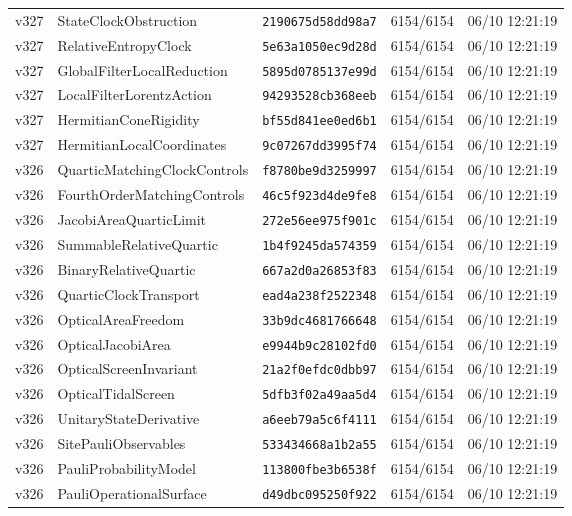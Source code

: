 \documentclass[11pt]{article}
\theoremstyle{definition}\newtheorem{deriv}{Derivation}
\begin{document}
{\begin{longtable}{@{}lllll@{}}
v327 & StateClockObstruction & \texttt{2190675d58dd98a7} & 6154/6154 & 06/10 12:21:19 \\
v327 & RelativeEntropyClock & \texttt{5e63a1050ec9d28d} & 6154/6154 & 06/10 12:21:19 \\
v327 & GlobalFilterLocalReduction & \texttt{5895d0785137e99d} & 6154/6154 & 06/10 12:21:19 \\
v327 & LocalFilterLorentzAction & \texttt{94293528cb368eeb} & 6154/6154 & 06/10 12:21:19 \\
v327 & HermitianConeRigidity & \texttt{bf55d841ee0ed6b1} & 6154/6154 & 06/10 12:21:19 \\
v327 & HermitianLocalCoordinates & \texttt{9c07267dd3995f74} & 6154/6154 & 06/10 12:21:19 \\
v326 & QuarticMatchingClockControls & \texttt{f8780be9d3259997} & 6154/6154 & 06/10 12:21:19 \\
v326 & FourthOrderMatchingControls & \texttt{46c5f923d4de9fe8} & 6154/6154 & 06/10 12:21:19 \\
v326 & JacobiAreaQuarticLimit & \texttt{272e56ee975f901c} & 6154/6154 & 06/10 12:21:19 \\
v326 & SummableRelativeQuartic & \texttt{1b4f9245da574359} & 6154/6154 & 06/10 12:21:19 \\
v326 & BinaryRelativeQuartic & \texttt{667a2d0a26853f83} & 6154/6154 & 06/10 12:21:19 \\
v326 & QuarticClockTransport & \texttt{ead4a238f2522348} & 6154/6154 & 06/10 12:21:19 \\
v326 & OpticalAreaFreedom & \texttt{33b9dc4681766648} & 6154/6154 & 06/10 12:21:19 \\
v326 & OpticalJacobiArea & \texttt{e9944b9c28102fd0} & 6154/6154 & 06/10 12:21:19 \\
v326 & OpticalScreenInvariant & \texttt{21a2f0efdc0dbb97} & 6154/6154 & 06/10 12:21:19 \\
v326 & OpticalTidalScreen & \texttt{5dfb3f02a49aa5d4} & 6154/6154 & 06/10 12:21:19 \\
v326 & UnitaryStateDerivative & \texttt{a6eeb79a5c6f4111} & 6154/6154 & 06/10 12:21:19 \\
v326 & SitePauliObservables & \texttt{533434668a1b2a55} & 6154/6154 & 06/10 12:21:19 \\
v326 & PauliProbabilityModel & \texttt{113800fbe3b6538f} & 6154/6154 & 06/10 12:21:19 \\
v326 & PauliOperationalSurface & \texttt{d49dbc095250f922} & 6154/6154 & 06/10 12:21:19 \\

\end{longtable}}
\end{document}
